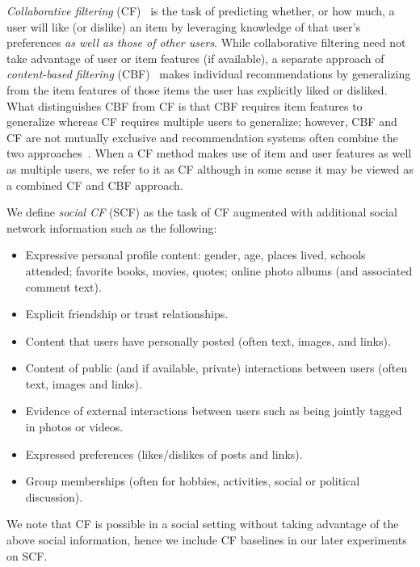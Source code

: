 \emph{Collaborative filtering} (CF)~\cite{collab_filtering} is the
task of predicting whether, or how much, a user will like (or dislike)
an item by leveraging knowledge of that user's preferences \emph{as
well as those of other users}.  While collaborative filtering need not
take advantage of user or item features (if available), a separate 
approach of \emph{content-based filtering} (CBF)~\cite{newsweeder}
makes individual recommendations by generalizing from the
item features of those items the user has
explicitly liked or disliked.
 What distinguishes
CBF from CF is that CBF requires item features to generalize whereas
CF requires multiple users to generalize; however,
CBF and CF are not mutually exclusive and recommendation systems often
combine the two approaches~\cite{fab}.   When a CF method makes use
of item and user features as well as multiple users, we refer to it as
CF although in some sense it may be viewed as a combined CF and CBF
approach.

We define \emph{social CF} (SCF) as the task of CF augmented
with additional social network information such as the following:
\begin{itemize}
\item Expressive personal profile content: gender, age, places lived, schools
attended; favorite books, movies, quotes; online photo albums (and associated comment text).
\item Explicit friendship or trust relationships.
\item Content that users have personally posted (often text, images, and links).
\item Content of public (and if available, private) interactions
between users (often text, images and links).
\item Evidence of external interactions between users such as being 
jointly tagged in photos or videos.
\item Expressed preferences (likes/dislikes of posts and links).
\item Group memberships (often for hobbies, activities, social or political discussion).
\end{itemize}
We note that CF is possible in a social setting without taking
advantage of the above social information, hence we include CF
baselines in our later experiments on SCF.  

